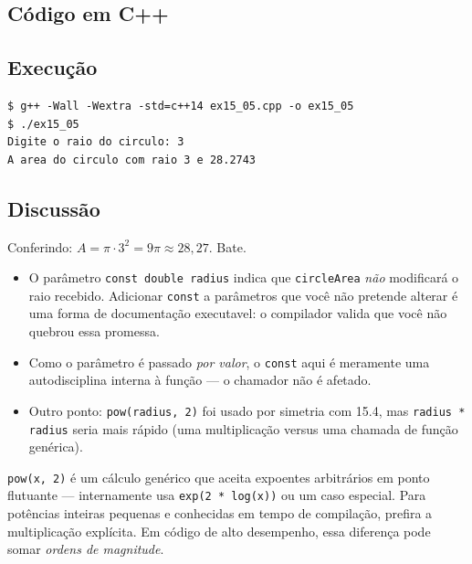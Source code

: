 \documentclass[11pt,a4paper]{article}
\begin{document}
\subsection*{C\'odigo em C++}



\subsection*{Execu\c{c}\~ao}

\begin{saidabox}
\begin{lstlisting}[style=terminal]
$ g++ -Wall -Wextra -std=c++14 ex15_05.cpp -o ex15_05
$ ./ex15_05
Digite o raio do circulo: 3
A area do circulo com raio 3 e 28.2743
\end{lstlisting}
\end{saidabox}

\subsection*{Discuss\~ao}

Conferindo: $A = \pi \cdot 3^{2} = 9\pi \approx 28{,}27$. Bate.

\begin{itemize}[leftmargin=*,itemsep=0pt]
  \item O par\^ametro \texttt{const double radius} indica que \texttt{circleArea} \emph{n\~ao} modificar\'a o raio recebido. Adicionar \texttt{const} a par\^ametros que voc\^e n\~ao pretende alterar \'e uma forma de documenta\c{c}\~ao executavel: o compilador valida que voc\^e n\~ao quebrou essa promessa.
  \item Como o par\^ametro \'e passado \emph{por valor}, o \texttt{const} aqui \'e meramente uma autodisciplina interna \`a fun\c{c}\~ao --- o chamador n\~ao \'e afetado.
  \item Outro ponto: \texttt{pow(radius, 2)} foi usado por simetria com 15.4, mas \texttt{radius * radius} seria mais r\'apido (uma multiplica\c{c}\~ao versus uma chamada de fun\c{c}\~ao gen\'erica).
\end{itemize}

\begin{dicadesemp}
\texttt{pow(x, 2)} \'e um c\'alculo gen\'erico que aceita expoentes arbitr\'arios em ponto flutuante --- internamente usa \texttt{exp(2 * log(x))} ou um caso especial. Para pot\^encias inteiras pequenas e conhecidas em tempo de compila\c{c}\~ao, prefira a multiplica\c{c}\~ao expl\'icita. Em c\'odigo de alto desempenho, essa diferen\c{c}a pode somar \emph{ordens de magnitude}.
\end{dicadesemp}
\end{document}
